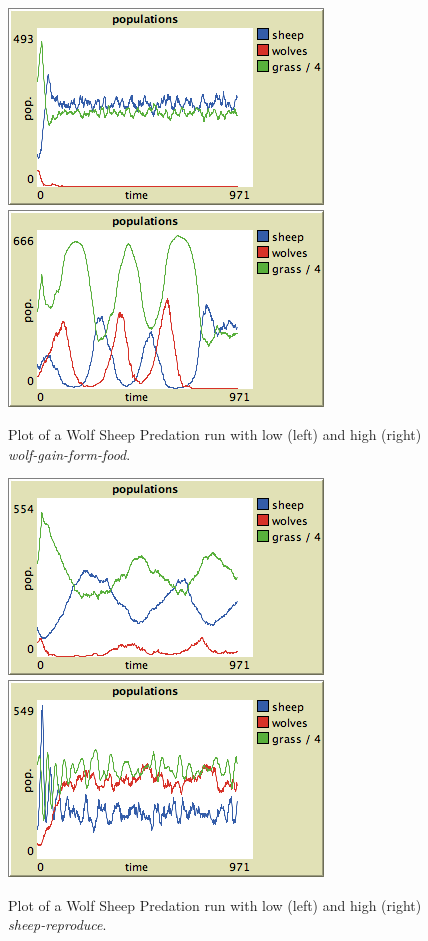 \begin{figure}[ht]
\centering
\includegraphics[scale=.666667]{images/wolfsheep/wolffood_low.png}
\includegraphics[scale=.666667]{images/wolfsheep/wolffood_high.png}
\caption{Plot of a Wolf Sheep Predation run with low (left) and high (right) \textit{wolf-gain-form-food}.}
\label{fig:wsp_wolffood}
\end{figure}


\begin{figure}[ht]
\centering
\includegraphics[scale=.666667]{images/wolfsheep/sheepsex_low.png}
\includegraphics[scale=.666667]{images/wolfsheep/sheepsex_high.png}
\caption{Plot of a Wolf Sheep Predation run with low (left) and high (right) \textit{sheep-reproduce}.}
\label{fig:wsp_sheepsex}
\end{figure}


